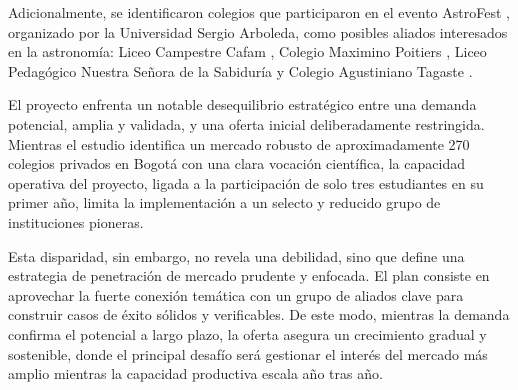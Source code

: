 Adicionalmente, se identificaron colegios que participaron en el evento AstroFest
\cite{astrofest2023}, organizado por la Universidad Sergio Arboleda,
como posibles aliados interesados en la astronomía: Liceo Campestre Cafam \cite{liceocafamweb},
Colegio Maximino Poitiers \cite{maximinoweb}, Liceo Pedagógico Nuestra Señora
de la Sabiduría \cite{sabiduriaweb} y Colegio Agustiniano Tagaste \cite{agustiniano_tagaste}.

El proyecto enfrenta un notable desequilibrio estratégico entre una demanda
potencial, amplia y validada, y una oferta inicial deliberadamente restringida.
Mientras el estudio identifica un mercado robusto de aproximadamente 270 colegios
privados en Bogotá con una clara vocación científica, la capacidad operativa del
proyecto, ligada a la participación de solo tres estudiantes en su primer año,
limita la implementación a un selecto y reducido grupo de instituciones pioneras.

Esta disparidad, sin embargo, no revela una debilidad, sino que define una
estrategia de penetración de mercado prudente y enfocada.
El plan consiste en aprovechar la fuerte conexión temática con un grupo de
aliados clave para construir casos de éxito sólidos y verificables.
De este modo, mientras la demanda confirma el potencial a largo plazo,
la oferta asegura un crecimiento gradual y sostenible, donde el principal
desafío será gestionar el interés del mercado más amplio mientras la capacidad
productiva escala año tras año.
